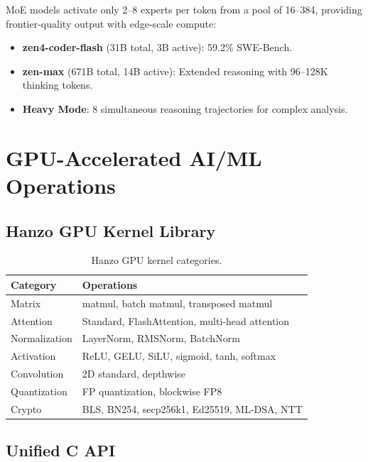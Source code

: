 \documentclass[11pt,letterpaper]{article}
\begin{document}
MoE models activate only 2--8 experts per token from a pool of 16--384, providing frontier-quality output with edge-scale compute:

\begin{itemize}
\item \textbf{zen4-coder-flash} (31B total, 3B active): 59.2\% SWE-Bench.
\item \textbf{zen-max} (671B total, 14B active): Extended reasoning with 96--128K thinking tokens.
\item \textbf{Heavy Mode}: 8 simultaneous reasoning trajectories for complex analysis.
\end{itemize}

\section{GPU-Accelerated AI/ML Operations}

\subsection{Hanzo GPU Kernel Library}

\begin{table}[H]
\centering
\begin{tabular}{@{}lp{7.5cm}@{}}
\toprule
\textbf{Category} & \textbf{Operations} \\
\midrule
Matrix & matmul, batch matmul, transposed matmul \\
Attention & Standard, FlashAttention, multi-head attention \\
Normalization & LayerNorm, RMSNorm, BatchNorm \\
Activation & ReLU, GELU, SiLU, sigmoid, tanh, softmax \\
Convolution & 2D standard, depthwise \\
Quantization & FP quantization, blockwise FP8 \\
Crypto & BLS, BN254, secp256k1, Ed25519, ML-DSA, NTT \\
\bottomrule
\end{tabular}
\caption{Hanzo GPU kernel categories.}
\label{tab:gpu-kernels}
\end{table}

\subsection{Unified C API}
\end{document}
